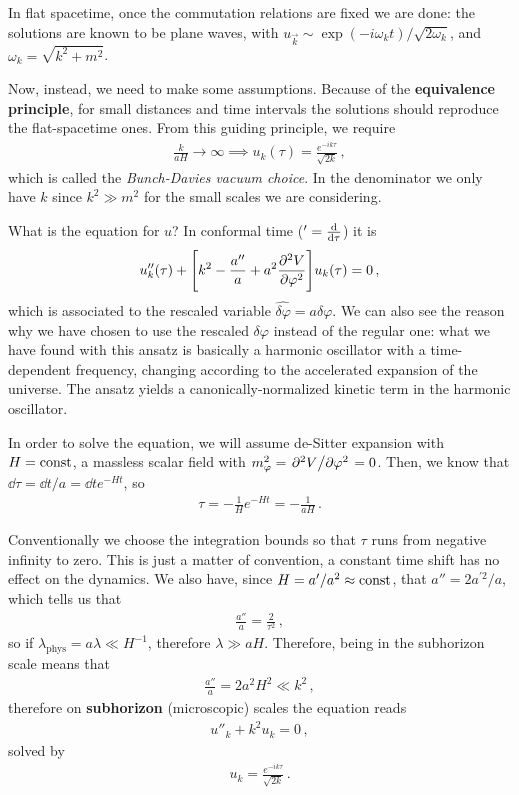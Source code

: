 \documentclass[main.tex]{subfiles}
\begin{document}
In flat spacetime, once the commutation relations are fixed we are done: the solutions are known to be plane waves, with \(u_{\vec{k}} \sim \exp(- i \omega _k t) / \sqrt{2 \omega _k}\), and \(\omega _k = \sqrt{k^2 + m^2}\). 

Now, instead, we need to make some assumptions. Because of the \textbf{equivalence principle}, for small distances and time intervals the solutions should reproduce the flat-spacetime ones. 
From this guiding principle, we require 
%
\begin{align}
\frac{k}{aH} \to \infty \implies 
u_k (\tau ) = \frac{e^{-i k \tau }}{\sqrt{2 k}}
\,,
\end{align}
%
which is called the \emph{Bunch-Davies vacuum choice}.
In the denominator we only have \(k\) since \(k^2\gg m^2\) for the small scales we are considering. 

What is the equation for \(u\)? In conformal time (\(' = \dv{}{\tau }\)) it is 
%
\begin{align}
u''_k (\tau ) + \qty[k^2  - \frac{a''}{a} + a^2 \pdv[2]{V}{\varphi }] u_k (\tau ) = 0
\,,
\end{align}
%
which is associated to the rescaled variable \( \hat{ \delta \varphi} = a \delta \varphi \). 
We can also see the reason why we have chosen to use the rescaled \(\delta \varphi \) instead of the regular one: what we have found with this ansatz is basically a harmonic oscillator with a time-dependent frequency, changing according to the accelerated expansion of the universe. 
The ansatz yields a canonically-normalized kinetic term in the harmonic oscillator. 

In order to solve the equation, we will assume de-Sitter expansion with \(H = \text{const}\), a massless scalar field with \(m_\varphi^2 = \pdv*[2]{V}{\varphi } = 0\). 
Then, we know that \(\dd{\tau } = \dd{t} / a = \dd{t} e^{-Ht}\), so 
%
\begin{align}
\tau = - \frac{1}{H} e^{-Ht} = - \frac{1}{aH}
\,.
\end{align}

Conventionally we choose the integration bounds so that \(\tau \) runs from negative infinity to zero. This is just a matter of convention, a constant time shift has no effect on the dynamics.
We also have, since \(H = a' / a^2 \approx \text{const}\), that \(a'' = 2 a^{\prime 2} / a\), which tells us that
%
\begin{align}
\frac{a''}{a} = \frac{2}{\tau^2}
\,,
\end{align}
%
so if \(\lambda _{\text{phys}} = a \lambda \ll H^{-1}\), therefore \(\lambda \gg aH\). Therefore, being in the subhorizon scale means that 
%
\begin{align}
\frac{a''}{a} = 2 a^2 H^2 \ll k^2
\,,
\end{align}
%
therefore on \textbf{subhorizon} (microscopic) scales the equation reads 
%
\begin{align}
u''_k + k^2 u_k = 0
\,,
\end{align}
%
solved by 
%
\begin{align}
u_k = \frac{e^{-ik \tau }}{\sqrt{2 k }}
\,.
\end{align}
\end{document}
